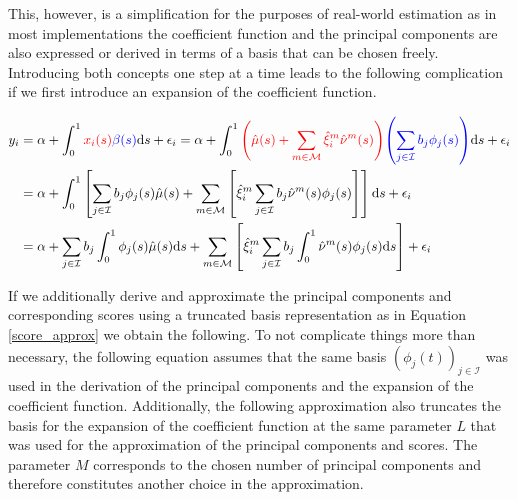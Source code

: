 \documentclass[11pt,twoside,a4paper]{article}
\begin{document}
	This, however, is a simplification for the purposes of real-world estimation as in most implementations the coefficient function and the principal components are also expressed or derived in terms of a basis that can be chosen freely. Introducing both concepts one step at a time leads to the following complication if we first introduce an expansion of the coefficient function.

	\begin{equation}
		\begin{split}
			y_i &= \alpha + \int_{0}^{1} {\color{red}x_i(s)} {\color{blue}\beta(s)} \mathrm{d}s + \epsilon_i
			= \alpha + \int_{0}^{1} {\color{red}\left(\hat{\mu}(s) + \sum_{m \in \mathcal{M}} \hat{\xi}^{m}_i \hat{\nu}^{m}(s)\right)} {\color{blue}\left(\sum_{j \in \mathcal{I}} b_j \phi_j(s)\right)} \mathrm{d}s + \epsilon_i\\
			&= \alpha + \int_{0}^{1} \left[ \sum_{j \in \mathcal{I}} b_j \phi_j(s) \hat{\mu}(s) + \sum_{m \in \mathcal{M}} \left[ \hat{\xi}^m_i \sum_{j \in \mathcal{I}} b_j \hat{\nu}^m(s) \phi_j(s) \right] \right] \mathrm{d}s + \epsilon_i \\
			&= \alpha + \sum_{j \in \mathcal{I}} b_j \int_{0}^{1} \phi_j(s) \hat{\mu}(s) \mathrm{d}s + \sum_{m \in \mathcal{M}} \left[ \hat{\xi}^m_i \sum_{j \in \mathcal{I}} b_j \int_{0}^{1}\hat{\nu}^m(s) \phi_j(s) \mathrm{d}s \right] + \epsilon_i
		\end{split}
	\end{equation}

	If we additionally derive and approximate the principal components and corresponding scores using a truncated basis representation as in Equation \ref{score_approx} we obtain the following. To not complicate things more than necessary, the following equation assumes that the same basis $\left(\phi_j(t)\right)_{j \in \mathcal{I}}$ was used in the derivation of the principal components and the expansion of the coefficient function. Additionally, the following approximation also truncates the basis for the expansion of the coefficient function at the same parameter $L$ that was used for the approximation of the principal components and scores. The parameter $M$ corresponds to the chosen number of principal components and therefore constitutes another choice in the approximation.
	
\end{document}
